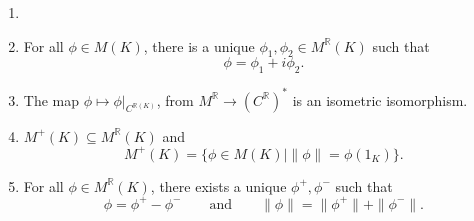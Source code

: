 \documentclass[12pt]{article}
\begin{document}
\begin{lemma}
	\begin{enumerate}[\normalfont(i)]
		\item[]
\item For all $\phi \in M(K)$, there is a unique $\phi_1, \phi_2 \in M^{\mathbb{R}}(K)$ such that
	\[
	\phi = \phi_1 + i \phi_2.
	\]
	\item The map $\phi \mapsto \phi|_{C^{\mathbb{R}(K)}}$, from $M^{\mathbb{R}} \to (C^{\mathbb{R}})^\ast$ is an isometric isomorphism.
	\item $M^+(K) \subseteq M^\mathbb{R}(K)$ and
		\[
			M^+(K) = \{ \phi \in M(K) \mid \|\phi\| = \phi(1_K)\}.
		\]
	\item For all $\phi \in M^\mathbb{R}(K)$, there exists a unique $\phi^+, \phi^-$ such that
		\[
			\phi = \phi^+ - \phi^- \qquad \text{and} \qquad \|\phi\| = \|\phi^+\| + \|\phi^-\|.
		\]
\end{enumerate}
\end{lemma}
\end{document}
